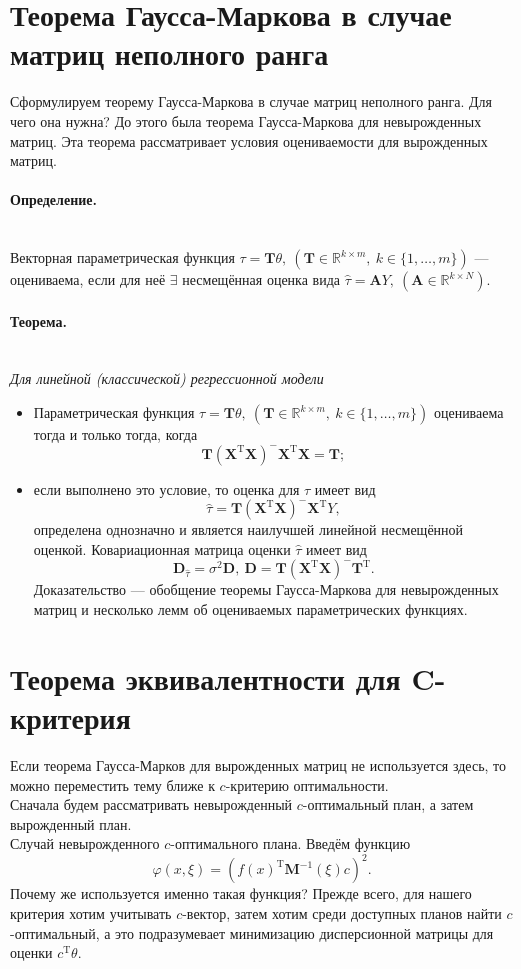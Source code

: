 \documentclass[12pt, a4paper]{article}
\newenvironment{definition}{\paragraph{Определение.}\hfill\\}{}
\newenvironment{theorem}{\paragraph{Теорема.}\hfill\\\itshape}{\par}
\newcommand{\R}{\mathbb{R}}
\begin{document}
	\section{Теорема Гаусса-Маркова в случае матриц неполного ранга}
	Сформулируем теорему Гаусса-Маркова в случае матриц неполного ранга. Для чего она нужна? До этого была теорема Гаусса-Маркова для невырожденных матриц. Эта теорема рассматривает условия оцениваемости для вырожденных матриц.
	\begin{definition}
		Векторная параметрическая функция $\tau=\mathbf{T}\theta,~(\mathbf{T}\in\R^{k\times m},~k\in\{1,\dots,m\})$ --- оцениваема, если для неё $\exists$ несмещённая оценка вида $\hat{\tau}=\mathbf{A}Y,~(\mathbf{A}\in\R^{k\times N})$.
	\end{definition}
	\begin{theorem}
		Для линейной (классической) регрессионной модели
		\begin{itemize}
			\item Параметрическая функция $\tau=\mathbf{T}\theta,~(\mathbf{T}\in\R^{k\times m},~k\in\{1,\dots,m\})$ оцениваема тогда и только тогда, когда
			\begin{equation*}
				\mathbf{T}(\mathbf{X}^\mathrm{T}\mathbf{X})^-\mathbf{X}^\mathrm{T}\mathbf{X}=\mathbf{T};
			\end{equation*}
			\item если выполнено это условие, то оценка для $\tau$ имеет вид
			\begin{equation*}
				\hat{\tau}=\mathbf{T}(\mathbf{X}^\mathrm{T}\mathbf{X})^-\mathbf{X}^\mathrm{T}Y,
			\end{equation*}
			определена однозначно и является наилучшей линейной несмещённой оценкой. Ковариационная матрица оценки $\hat{\tau}$ имеет вид
			\begin{equation*}
				\mathbf{D}_{\hat{\tau}}=\sigma^2\mathbf{D},~\mathbf{D}=\mathbf{T}(\mathbf{X}^\mathrm{T}\mathbf{X})^-\mathbf{T}^\mathrm{T}.
			\end{equation*}
			Доказательство --- обобщение теоремы Гаусса-Маркова для невырожденных матриц и несколько лемм об оцениваемых параметрических функциях.
		\end{itemize}
	\end{theorem}
	\section{Теорема эквивалентности для C-критерия}
	Если теорема Гаусса-Марков для вырожденных матриц не используется здесь, то можно переместить тему ближе к $c$-критерию оптимальности.\\
	Сначала будем рассматривать невырожденный $c$-оптимальный план, а затем вырожденный план.\\
	Случай невырожденного $c$-оптимального плана. Введём функцию
	\begin{equation*}
		\varphi(x,\xi)=(f(x)^\mathrm{T}\mathbf{M}^{-1}(\xi)c)^2.
	\end{equation*}
	Почему же используется именно такая функция? Прежде всего, для нашего критерия хотим учитывать $c$-вектор, затем хотим среди доступных планов найти $c$-оптимальный, а это подразумевает минимизацию дисперсионной матрицы для оценки $c^\mathrm{T}\theta$.
	
\end{document}
